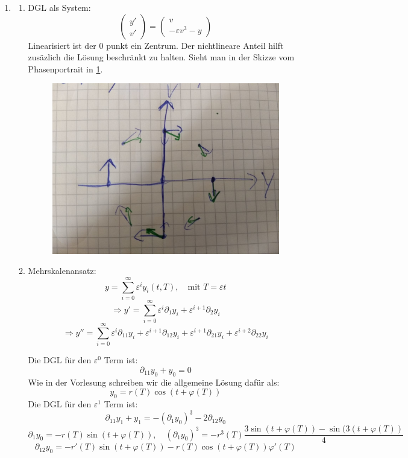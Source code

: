 \documentclass[a4paper,11pt]{scrartcl}
\newcommand*{\eps}{\varepsilon}
\newcommand*{\sm}{\sum_{i=0}^\infty}
\begin{document}
\begin{enumerate}[label*=\textbf{9.\arabic*.}]

\item
  \begin{enumerate}
  \item
    DGL als System:
    \[\begin{pmatrix}y'\\v'\end{pmatrix}=
      \begin{pmatrix}v\\-\eps v^3 - y\end{pmatrix}
    \]
    Linearisiert ist der 0 punkt ein Zentrum.
    Der nichtlineare Anteil hilft zusäzlich die Lösung beschränkt zu halten.
    Sieht man in der Skizze vom Phasenportrait in \cref{fig:phaseportrait_9.1a}.

    \begin{figure}
    \centering
    \includegraphics[width=.5\linewidth]{1a.jpg}
    \label{fig:phaseportrait_9.1a}
    \end{figure}

  \item
    Mehrskalenansatz:
    \[ y = \sm \eps^i y_i(t, T), \quad \text{mit } T = \eps t \]
    \[ \Rightarrow y' = \sm \eps^i \partial_{1} y_i + \eps^{i+1} \partial_2 y_i\]
    \[ \Rightarrow y'' = \sm \eps^i \partial_{11} y_i + \eps^{i+1} \partial_{12}
      y_i + \eps^{i+1} \partial_{21} y_i + \eps^{i+2} \partial_{22} y_i\]

    Die DGL für den $\eps^0$ Term ist:
    \[ \partial_{11} y_0 + y_0 = 0\]
    Wie in der Vorlesung schreiben wir die allgemeine Lösung dafür als:
    \[ y_0 = r(T) \cos(t + \varphi(T))\]
    Die DGL für den $\eps^1$ Term ist:
    \[\partial_{11} y_1 + y_1 = - (\partial_1 y_0)^3 -2 \partial_{12} y_0\]
    \[\partial_1 y_0 = -r(T) \sin(t+\varphi(T)), \quad (\partial_1 y_0)^3 =
      -r^3(T) \frac{3 \sin(t + \varphi(T)) - \sin(3 (t + \varphi(T))}{4}\]
    \[\partial_{12} y_0 = -r'(T) \sin(t+\varphi(T)) - r(T) \cos(t + \varphi(T)) \varphi'(T) \]


\end{enumerate}
\end{enumerate}
\end{document}
